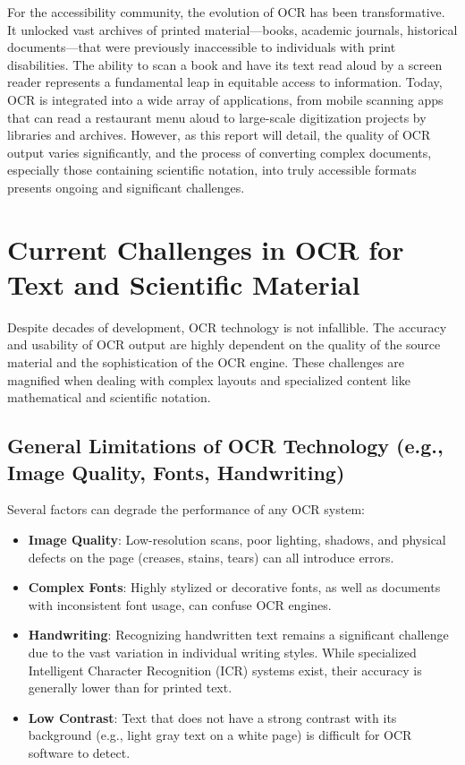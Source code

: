 For the accessibility community, the evolution of OCR has been transformative. It unlocked vast archives of printed material—books, academic journals, historical documents—that were previously inaccessible to individuals with print disabilities. The ability to scan a book and have its text read aloud by a screen reader represents a fundamental leap in equitable access to information. Today, OCR is integrated into a wide array of applications, from mobile scanning apps that can read a restaurant menu aloud to large-scale digitization projects by libraries and archives. However, as this report will detail, the quality of OCR output varies significantly, and the process of converting complex documents, especially those containing scientific notation, into truly accessible formats presents ongoing and significant challenges.

\section{Current Challenges in OCR for Text and Scientific Material}
\label{sec:ocr-challenges}
Despite decades of development, OCR technology is not infallible. The accuracy and usability of OCR output are highly dependent on the quality of the source material and the sophistication of the OCR engine. These challenges are magnified when dealing with complex layouts and specialized content like mathematical and scientific notation.

\subsection{General Limitations of OCR Technology (e.g., Image Quality, Fonts, Handwriting)}
\label{subsec:ocr-general-limitations}
Several factors can degrade the performance of any OCR system:
\begin{itemize}
	\item \textbf{Image Quality}: Low-resolution scans, poor lighting, shadows, and physical defects on the page (creases, stains, tears) can all introduce errors.
	\item \textbf{Complex Fonts}: Highly stylized or decorative fonts, as well as documents with inconsistent font usage, can confuse OCR engines.
	\item \textbf{Handwriting}: Recognizing handwritten text remains a significant challenge due to the vast variation in individual writing styles. While specialized Intelligent Character Recognition (ICR) systems exist, their accuracy is generally lower than for printed text.
	\item \textbf{Low Contrast}: Text that does not have a strong contrast with its background (e.g., light gray text on a white page) is difficult for OCR software to detect.
\end{itemize}

